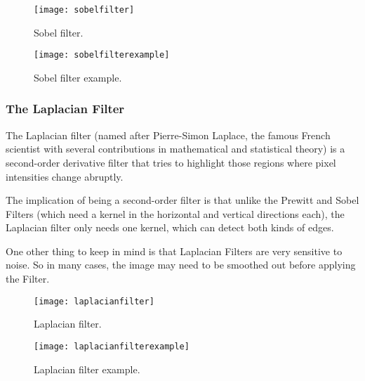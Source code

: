 	\begin{figure}[h]
		\centering
		\texttt{[image: sobelfilter]}
		\caption[Sobel filter]{Sobel filter.}
		\label{fig:sobelfilter}
	\end{figure}
	\begin{figure}[h]
		\centering
		\texttt{[image: sobelfilterexample]}
		\caption[Sobel filter example]{Sobel filter example.}
		\label{fig:sobelfileterexample}
	\end{figure}


	\subsubsection{The Laplacian Filter}
	\begin{bulletedlist}
		\item The Laplacian filter (named after Pierre-Simon Laplace, the famous French scientist with several contributions in mathematical and statistical theory) is a second-order derivative filter that tries to highlight those regions where pixel intensities change abruptly.
		\item The implication of being a second-order filter is that unlike the Prewitt and Sobel Filters (which need a kernel in the horizontal and vertical directions each), the Laplacian filter only needs one kernel, which can detect both kinds of edges.
		\item One other thing to keep in mind is that Laplacian Filters are very sensitive to noise. So in many cases, the image may need to be smoothed out before applying the Filter.
	\end{bulletedlist}

	\begin{figure}[h]
		\centering
		\texttt{[image: laplacianfilter]}
		\caption[Laplacian filter]{Laplacian filter.}
		\label{fig:laplacianfilter}
	\end{figure}
	\begin{figure}[h]
		\centering
		\texttt{[image: laplacianfilterexample]}
		\caption[Laplacian filter example]{Laplacian filter example.}
		\label{fig:laplacianfilterexample}
	\end{figure}


